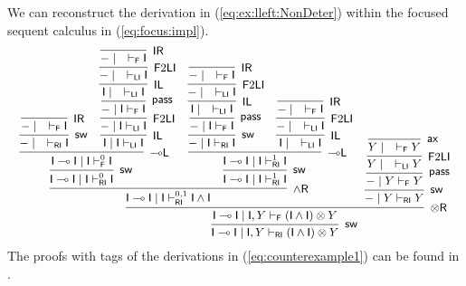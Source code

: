 \documentclass[submission,copyright,creativecommons]{eptcs}
\theoremstyle{definition}
\newcommand{\tr}{\otimes \mathsf{R}}
\newcommand{\lleft}{{\multimap}\mathsf{L}}
\newcommand{\pass}{\mathsf{pass}}
\newcommand{\unitl}{\mathsf{IL}}
\newcommand{\unitr}{\mathsf{IR}}
\newcommand{\andr}{\land \mathsf{R}}
\newcommand{\ax}{\mathsf{ax}}
\newcommand{\ot}{\otimes}
\newcommand{\lolli}{\multimap}
\newcommand{\I}{\mathsf{I}}
\newcommand{\RI}{\mathsf{RI}}
\newcommand{\LI}{\mathsf{LI}}
\newcommand{\F}{\mathsf{F}}
\newcommand{\sw}{\mathsf{sw}}
\newcommand{\proofbox}[1]{\begin{tabular}{l} #1 \end{tabular}}
\begin{document}
We can reconstruct the derivation in (\ref{eq:ex:lleft:NonDeter}) within the focused sequent calculus in (\ref{eq:focus:impl}).
\begin{displaymath}\small
  \infer[\sw]{\I \lolli \I \mid \I , Y \vdash_{\RI} (\I \land \I) \ot Y}{
    \infer[\tr]{\I \lolli \I \mid \I , Y \vdash_{\F} (\I \land \I) \ot Y}{
      \infer[\andr]{\I \lolli \I \mid \I \vdash^{0 , 1}_{\RI} \I \land \I}{
        \infer[\sw]{\I \lolli \I \mid \I \vdash^{0}_{\RI} \I}{
          \infer[\lleft]{\I \lolli \I \mid \I \vdash^{0}_{\F} \I}{
            \infer[\sw]{- \mid \quad \vdash_{\RI} \I}{
              \infer[\unitr]{- \mid \quad \vdash_{\F} \I}{}
            }
            &
            \infer[\unitl]{\I \mid \I \vdash_{\LI} \I}{
              \infer[\F 2 \LI]{- \mid \I \vdash_{\LI} \I}{
                \infer[\pass]{- \mid \I \vdash_{\F} \I}{
                  \infer[\unitl]{\I \mid \quad \vdash_{\LI} \I}{
                    \infer[\F 2 \LI]{- \mid \quad \vdash_{\LI} \I}{
                      \infer[\unitr]{- \mid \quad \vdash_{\F} \I}{}
                    }
                  }
                }
              }
            }
          }
        }
        &
        \infer[\sw]{\I \lolli \I \mid \I \vdash^{1}_{\RI} \I}{
          \infer[\lleft]{\I \lolli \I \mid \I \vdash^{1}_{\RI} \I}{
            \infer[\sw]{- \mid \I \vdash_{\RI} \I}{
              \infer[\pass]{- \mid \I \vdash_{\F} \I}{
                \infer[\unitl]{\I \mid \quad \vdash_{\LI} \I}{
                  \infer[\F 2 \LI]{- \mid \quad \vdash_{\LI} \I}{
                    \infer[\unitr]{- \mid \quad \vdash_{\F} \I}{}
                  }
                }
              }
            }
            &
            \infer[\unitl]{\I \mid \quad \vdash_{\LI} \I}{
              \infer[\F 2 \LI]{- \mid \quad \vdash_{\LI} \I}{
                \infer[\unitr]{- \mid \quad \vdash_{\F} \I}{}
              }
            }
          }
        }
      }
      &
      \infer[\sw]{- \mid Y \vdash_{\RI} Y}{
        \infer[\pass]{- \mid Y \vdash_{\F} Y}{
          \infer[\F 2 \LI]{Y \mid \quad \vdash_{\LI} Y}{
            \infer[\ax]{Y \mid \quad \vdash_{\F} Y}{}
          }
        }
      }
    }
  }
\end{displaymath}
The proofs with tags of the derivations in (\ref{eq:counterexample1}) can be found in \cite{UVW:protsn}.
\end{document}
